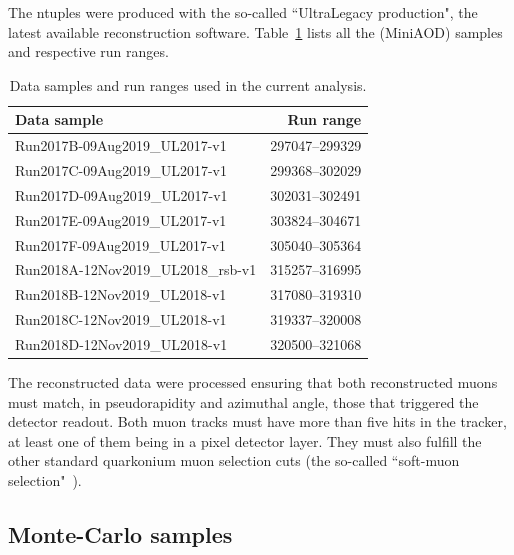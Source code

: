 The ntuples were produced with the so-called ``UltraLegacy production", 
the latest available reconstruction software.
Table~\ref{tab:PDs} lists all the (MiniAOD) samples and respective run ranges.

\begin{table}[h]
\centering 
\caption{Data samples and run ranges used in the current analysis.}
\label{tab:PDs}
\begin{tabular}{lr}\hline
Data sample               & Run range \\ \hline
Run2017B-09Aug2019\_UL2017-v1 & 297047--299329 \\
Run2017C-09Aug2019\_UL2017-v1 & 299368--302029 \\
Run2017D-09Aug2019\_UL2017-v1 & 302031--302491 \\
Run2017E-09Aug2019\_UL2017-v1 & 303824--304671 \\
Run2017F-09Aug2019\_UL2017-v1 & 305040--305364 \\ \hline
Run2018A-12Nov2019\_UL2018\_rsb-v1 & 315257--316995 \\
Run2018B-12Nov2019\_UL2018-v1 & 317080--319310 \\
Run2018C-12Nov2019\_UL2018-v1 & 319337--320008 \\
Run2018D-12Nov2019\_UL2018-v1 & 320500--321068 \\ \hline
\end{tabular}
\end{table}

The reconstructed data were processed ensuring that both reconstructed muons 
must match, in pseudorapidity and azimuthal angle, those that triggered the detector readout.
Both muon tracks must have more than five hits in the tracker, 
at least one of them being in a pixel detector layer.
They must also fulfill the other standard quarkonium muon selection cuts 
(the so-called ``soft-muon selection"~\cite{bib:softmuon2}).

\subsection{Monte-Carlo samples}
\label{sec:mcsamples}

